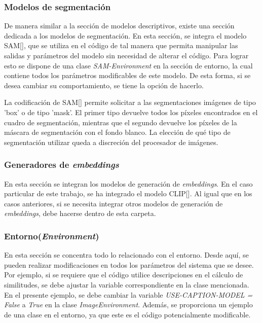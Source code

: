 \subsubsection{Modelos de segmentaci\'on}
De manera similar a la sección de modelos descriptivos, existe una sección dedicada a los modelos de segmentación. En esta sección, se integra el modelo SAM[\cite{huggingface2022sam}], que se utiliza en el código de tal manera que permita manipular las salidas y par\'ametros del modelo sin necesidad de alterar el código. Para lograr esto se dispone de una clase \textit{SAM-Environment} en la sección de entorno, la cual contiene todos los par\'ametros modificables de este modelo. De esta forma, si se desea cambiar su comportamiento, se tiene la opción de hacerlo.

La codificación de SAM[\cite{huggingface2022sam}] permite solicitar a las segmentaciones im\'agenes de tipo 'box' o de tipo 'mask'. El primer tipo devuelve todos los píxeles encontrados en el cuadro de segmentación, mientras que el segundo devuelve los píxeles de la m\'ascara de segmentación con el fondo blanco. La elección de qué tipo de segmentación utilizar queda a discreción del procesador de im\'agenes.

\subsubsection{Generadores de \textit{embeddings}}
En esta sección se integran los modelos de generación de \textit{embeddings}. En el caso particular de este trabajo, se ha integrado el modelo CLIP[\cite{git-clip}]. Al igual que en los casos anteriores, si se necesita integrar otros modelos de generación de \textit{embeddings}, debe hacerse dentro de esta carpeta.

\subsubsection{Entorno(\textit{Environment})}
En esta sección se concentra todo lo relacionado con el entorno. Desde aquí, se pueden realizar modificaciones en todos los par\'ametros del sistema que se desee. Por ejemplo, si se requiere que el código utilice descripciones en el c\'alculo de similitudes, se debe ajustar la variable correspondiente en la clase mencionada. En el presente ejemplo, se debe cambiar la variable \textit{USE-CAPTION-MODEL = False} a \textit{True} en la clase \textit{ImageEnvironment}. Adem\'as, se proporciona un ejemplo de una clase en el entorno, ya que este es el código potencialmente modificable.

